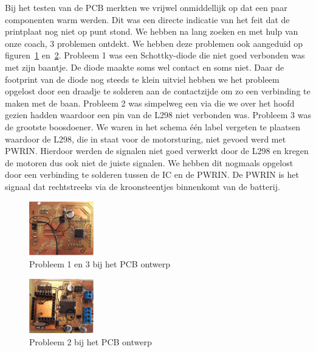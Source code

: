 Bij het testen van de PCB merkten we vrijwel onmiddellijk op dat een paar componenten warm werden. Dit was een directe indicatie van het feit dat de printplaat nog niet op punt stond. We hebben na lang zoeken en met hulp van onze coach, 3 problemen ontdekt. We hebben deze problemen ook aangeduid op figuren~\ref{fig:prob1} en~\ref{fig:prob3}.
Probleem 1 was een Schottky-diode die niet goed verbonden was met zijn baantje. De diode maakte soms wel contact en soms niet. Daar de footprint van de diode nog steeds te klein uitviel hebben we het probleem opgelost door een draadje te solderen aan de contactzijde om zo een verbinding te maken met de baan.
Probleem 2 was simpelweg een via die we over het hoofd gezien hadden waardoor een pin van de L298 niet verbonden was. 
Probleem 3 was de grootste boosdoener. We waren in het schema \'e\'en label vergeten te plaatsen waardoor de L298, die in staat voor de motorsturing, niet gevoed werd met PWRIN. Hierdoor werden de signalen niet goed verwerkt door de L298 en kregen de motoren dus ook niet de juiste signalen. We hebben dit nogmaals opgelost door een verbinding te solderen tussen de IC en de PWRIN. De PWRIN is het signaal dat rechtstreeks via de kroonsteentjes binnenkomt van de batterij.
\begin{figure}[h]
\centering
\includegraphics[width=0.25\textwidth]{PCBProblemenVoorkant.png}
\caption{Probleem 1 en 3 bij het PCB ontwerp}
\label{fig:prob1}
\end{figure}

\begin{figure}[h]
\centering
\includegraphics[width=0.25\textwidth]{PCBProblemenAchterkant.png}
\caption{Probleem 2 bij het PCB ontwerp}
\label{fig:prob3}
\end{figure}



